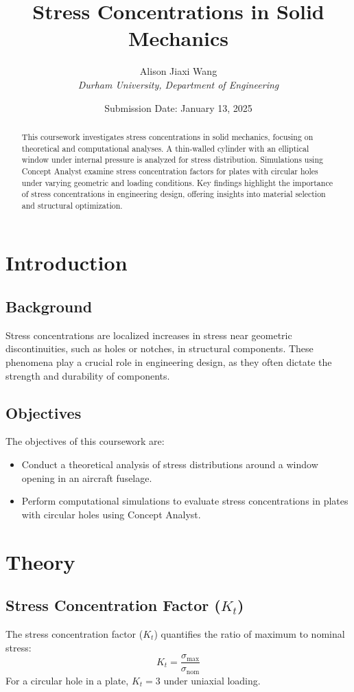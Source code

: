 \documentclass[a4paper,11pt]{article}
\title{\textbf{Stress Concentrations in Solid Mechanics}}
\author{Alison Jiaxi Wang \\ \textit{Durham University, Department of Engineering}}
\date{Submission Date: January 13, 2025}
\begin{document}
\maketitle
\thispagestyle{empty}

\begin{abstract}
This coursework investigates stress concentrations in solid mechanics, focusing on theoretical and computational analyses. A thin-walled cylinder with an elliptical window under internal pressure is analyzed for stress distribution. Simulations using Concept Analyst examine stress concentration factors for plates with circular holes under varying geometric and loading conditions. Key findings highlight the importance of stress concentrations in engineering design, offering insights into material selection and structural optimization.
\end{abstract}

\tableofcontents
\newpage

\section{Introduction}
\subsection{Background}
Stress concentrations are localized increases in stress near geometric discontinuities, such as holes or notches, in structural components. These phenomena play a crucial role in engineering design, as they often dictate the strength and durability of components.

\subsection{Objectives}
The objectives of this coursework are:
\begin{itemize}
    \item Conduct a theoretical analysis of stress distributions around a window opening in an aircraft fuselage.
    \item Perform computational simulations to evaluate stress concentrations in plates with circular holes using Concept Analyst.
\end{itemize}

\section{Theory}
\subsection{Stress Concentration Factor (\(K_t\))}
The stress concentration factor (\(K_t\)) quantifies the ratio of maximum to nominal stress:
\begin{equation}
    K_t = \frac{\sigma_{\text{max}}}{\sigma_{\text{nom}}}
\end{equation}
For a circular hole in a plate, \(K_t = 3\) under uniaxial loading.
\end{document}
